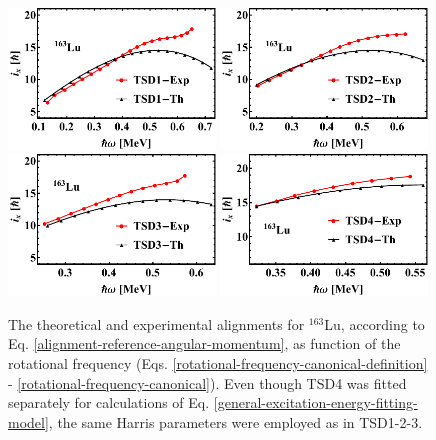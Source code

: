 \begin{figure}
    \centering
    \includegraphics[width=0.49\textwidth]{Chapters/Figures/Lu-exp-energies/fig8a_lu163.pdf}
    \includegraphics[width=0.49\textwidth]{Chapters/Figures/Lu-exp-energies/fig8b_lu163.pdf}
    \includegraphics[width=0.49\textwidth]{Chapters/Figures/Lu-exp-energies/fig8c_lu163.pdf}
    \includegraphics[width=0.49\textwidth]{Chapters/Figures/Lu-exp-energies/fig8d_lu163.pdf}
    \caption{The theoretical and experimental alignments for $^{163}$Lu, according to Eq. \ref{alignment-reference-angular-momentum}, as function of the rotational frequency (Eqs. \ref{rotational-frequency-canonical-definition} - \ref{rotational-frequency-canonical}). Even though TSD4 was fitted separately for calculations of Eq. \ref{general-excitation-energy-fitting-model}, the same Harris parameters were employed as in TSD1-2-3.}
    \label{alignments-lu-163}
\end{figure}
